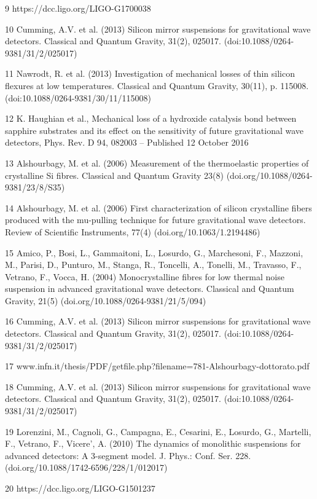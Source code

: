 9 https://dcc.ligo.org/LIGO-G1700038

10 Cumming, A.V. et al. (2013) Silicon mirror suspensions for gravitational wave detectors. Classical and Quantum Gravity, 31(2), 025017. (doi:10.1088/0264-9381/31/2/025017)

11 Nawrodt, R. et al. (2013) Investigation of mechanical losses of thin silicon flexures at low temperatures. Classical and Quantum Gravity, 30(11), p. 115008. (doi:10.1088/0264-9381/30/11/115008)

12 K. Haughian et al., Mechanical loss of a hydroxide catalysis bond between sapphire substrates and its effect on the sensitivity of future gravitational wave detectors, Phys. Rev. D 94, 082003 – Published 12 October 2016

13 Alshourbagy, M. et al. (2006) Measurement of the thermoelastic properties of crystalline Si fibres. Classical and Quantum Gravity 23(8) (doi.org/10.1088/0264-9381/23/8/S35)

14 Alshourbagy, M. et al. (2006) First characterization of silicon crystalline fibers produced with the mu-pulling technique for future gravitational wave detectors. Review of Scientific Instruments, 77(4) (doi.org/10.1063/1.2194486)

15 Amico, P., Bosi, L., Gammaitoni, L., Losurdo, G., Marchesoni, F., Mazzoni, M., Parisi, D., Punturo, M., Stanga, R., Toncelli, A., Tonelli, M., Travasso, F., Vetrano, F., Vocca, H. (2004) Monocrystalline fibres for low thermal noise suspension in advanced gravitational wave detectors. Classical and Quantum Gravity, 21(5) (doi.org/10.1088/0264-9381/21/5/094)

16 Cumming, A.V. et al. (2013) Silicon mirror suspensions for gravitational wave detectors. Classical and Quantum Gravity, 31(2), 025017. (doi:10.1088/0264-9381/31/2/025017)

17 www.infn.it/thesis/PDF/getfile.php?filename=781-Alshourbagy-dottorato.pdf

18 Cumming, A.V. et al. (2013) Silicon mirror suspensions for gravitational wave detectors. Classical and Quantum Gravity, 31(2), 025017. (doi:10.1088/0264-9381/31/2/025017)

19 Lorenzini, M., Cagnoli, G., Campagna, E., Cesarini, E., Losurdo, G., Martelli, F., Vetrano, F., Vicere', A. (2010) The dynamics of monolithic suspensions for advanced detectors: A 3-segment model. J. Phys.: Conf. Ser. 228. (doi.org/10.1088/1742-6596/228/1/012017)

20 https://dcc.ligo.org/LIGO-G1501237

